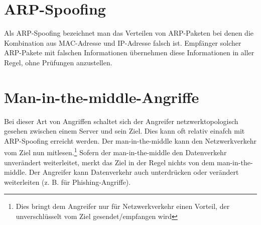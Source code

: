 \begin{multicols}{3}
\section{ARP-Spoofing}
Als ARP-Spoofing bezeichnet man das Verteilen von ARP-Paketen bei denen die Kombination aus MAC-Adresse und IP-Adresse falsch ist. Empfänger solcher ARP-Pakete mit falschen Informationen übernehmen diese Informationen in aller Regel, ohne Prüfungen anzustellen.
\section{Man-in-the-middle-Angriffe}
Bei dieser Art von Angriffen schaltet sich der Angreifer netzwerktopologisch gesehen zwischen einem Server und sein Ziel. Dies kann oft relativ einafch mit ARP-Spoofing erreicht werden. Der man-in-the-middle kann den Netzwerkverkehr vom Ziel nun mitlesen.\footnote{Dies bringt dem Angreifer nur für Netzwerkverkehr einen Vorteil, der unverschlüsselt vom Ziel gesendet/empfangen wird} Sofern der man-in-the-middle den Datenverkehr unverändert weiterleitet, merkt das Ziel in der Regel nichts von dem man-in-the-middle. Der Angreifer kann Datenverkehr auch unterdrücken oder verändert weiterleiten (z. B. für Phishing-Angriffe).
\end{multicols}